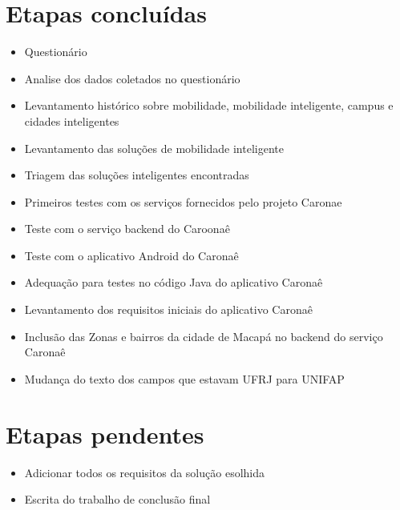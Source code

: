  %

\section{Etapas concluídas}

\begin{itemize}
    \item Questionário
    \item Analise dos dados coletados no questionário 
    \item Levantamento histórico sobre mobilidade, mobilidade inteligente, campus e cidades inteligentes %
    \item Levantamento das soluções de mobilidade inteligente
    \item Triagem das soluções inteligentes encontradas
    \item Primeiros testes com os serviços fornecidos pelo projeto Caronae
    \item Teste com o serviço backend do Caroonaê
    \item Teste com o aplicativo Android do Caronaê
    \item Adequação para testes no código Java do aplicativo Caronaê
    \item Levantamento dos requisitos iniciais do aplicativo Caronaê
    \item Inclusão das Zonas e bairros da cidade de Macapá no backend do serviço Caronaê
    \item Mudança do texto dos campos que estavam UFRJ para UNIFAP
\end{itemize}

\section{Etapas pendentes}

\begin{itemize}
    \item Adicionar todos os requisitos da solução esolhida
    \item Escrita do trabalho de conclusão final
\end{itemize}
